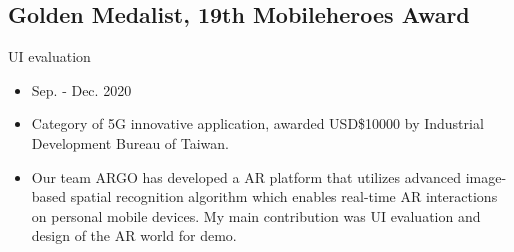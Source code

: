 \documentclass[12pt]{article}
\begin{document}
        \subsection*{Golden Medalist, 19th Mobileheroes Award}
        {\sffamily
        UI evaluation
        \begin{itemize}
            \item Sep. - Dec. 2020
            \item Category of 5G innovative application, awarded USD\$10000 by Industrial Development Bureau of Taiwan.
            \item Our team ARGO has developed a AR platform that utilizes advanced image-based spatial recognition algorithm which enables real-time AR interactions on personal mobile devices. My main contribution was UI evaluation and design of the AR world for demo.   
        \end{itemize}
        }
        
\end{document}
